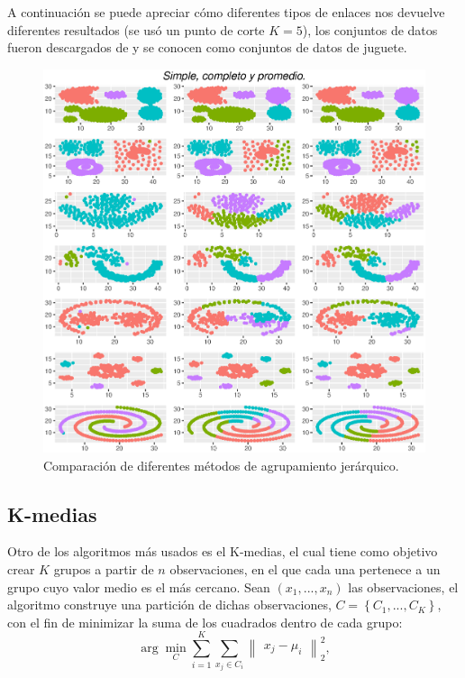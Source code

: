 \documentclass[12pt]{report} %
\theoremstyle{definition}
\begin{document}
{A continuación se puede apreciar cómo diferentes tipos de enlaces nos devuelve diferentes resultados (se usó un punto de corte $K=5$), los conjuntos de datos fueron descargados de \cite{ClusteringDatasets} y se conocen como conjuntos de datos de juguete.

\begin{figure}[H]
	\centering
	\includegraphics[scale=0.7]{imagenes/linkages.eps}
	\caption{Comparación de diferentes métodos de agrupamiento jerárquico.}
\end{figure}

\subsection{K-medias}

Otro de los algoritmos más usados es el K-medias, el cual tiene como objetivo crear $K$ grupos a partir de $n$ observaciones, en el que cada una pertenece a un grupo cuyo valor medio es el más cercano. Sean $(x_1,...,x_n)$ las observaciones, el algoritmo construye una partición de dichas observaciones, $C = \left\lbrace C_1,...,C_K \right\rbrace $, con el fin de minimizar la suma de los cuadrados dentro de cada grupo:
\begin{equation}
	\arg \min_C \sum_{i=1}^{K} \sum_{x_j \in C_i}  \begin{Vmatrix} x_j-\mu_i \end{Vmatrix}_2^2,
\end{equation}

}
\end{document}
